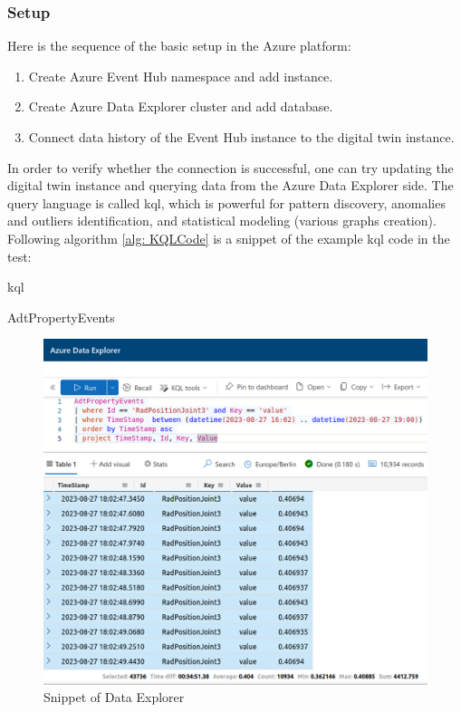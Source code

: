 \subsubsection{Setup}
Here is the sequence of the basic setup in the Azure platform:
\begin{enumerate}
    \item Create Azure Event Hub namespace and add instance.
    \item Create Azure Data Explorer cluster and add database.
    \item Connect data history of the Event Hub instance to the digital twin instance.
\end{enumerate}

In order to verify whether the connection is successful, one can try updating the 
digital twin instance and querying data from the Azure Data Explorer side. The query
language is called \gls{kql}, which is powerful for pattern discovery, anomalies 
and outliers identification, and statistical modeling (various graphs creation). 
Following algorithm \ref{alg: KQLCode} is a snippet of the example \gls{kql} code in the test: 

\begin{algorithm}
    \caption{\gls{kql}}
    \label{alg: KQLCode}
    \begin{algorithmic}
        \State  AdtPropertyEvents 
    \end{algorithmic}
\end{algorithm}


\begin{figure}[htb]
    \includegraphics[width=\textwidth]{figures/KQL_cut.jpg}
    
    \centering
    \caption{Snippet of Data Explorer\label{fig: KQL}}
\end{figure}

